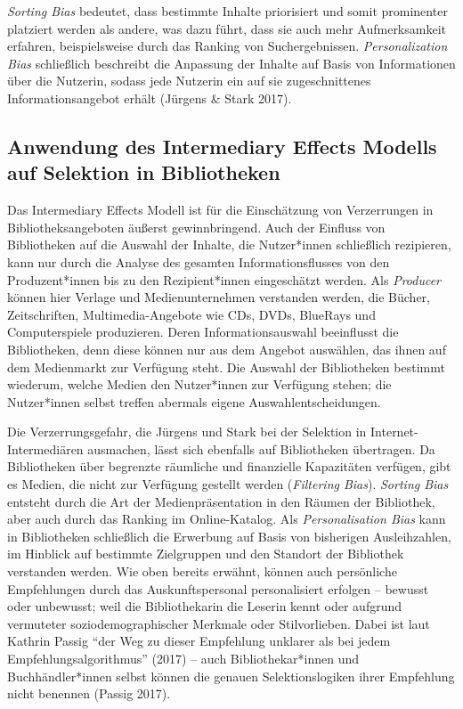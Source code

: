 \documentclass[a4paper,
fontsize=11pt,
oneside,
numbers=noperiodatend,
parskip=half-,
bibliography=totoc,
final
]{scrartcl}
\begin{document}
\emph{Sorting Bias} bedeutet, dass bestimmte Inhalte priorisiert und
somit prominenter platziert werden als andere, was dazu führt, dass sie
auch mehr Aufmerksamkeit erfahren, beispielsweise durch das Ranking von
Suchergebnissen. \emph{Personalization Bias} schließlich beschreibt die
Anpassung der Inhalte auf Basis von Informationen über die Nutzerin,
sodass jede Nutzerin ein auf sie zugeschnittenes Informationsangebot
erhält (Jürgens \& Stark 2017).

\hypertarget{anwendung-des-intermediary-effects-modells-auf-selektion-in-bibliotheken}{%
\subsection{Anwendung des Intermediary Effects Modells auf Selektion in
Bibliotheken}\label{anwendung-des-intermediary-effects-modells-auf-selektion-in-bibliotheken}}

Das Intermediary Effects Modell ist für die Einschätzung von
Verzerrungen in Bibliotheksangeboten äußerst gewinnbringend. Auch der
Einfluss von Bibliotheken auf die Auswahl der Inhalte, die Nutzer*innen
schließlich rezipieren, kann nur durch die Analyse des gesamten
Informationsflusses von den Produzent*innen bis zu den Rezipient*innen
eingeschätzt werden. Als \emph{Producer} können hier Verlage und
Medienunternehmen verstanden werden, die Bücher, Zeitschriften,
Multimedia-Angebote wie CDs, DVDs, BlueRays und Computerspiele
produzieren. Deren Informationsauswahl beeinflusst die Bibliotheken,
denn diese können nur aus dem Angebot auswählen, das ihnen auf dem
Medienmarkt zur Verfügung steht. Die Auswahl der Bibliotheken bestimmt
wiederum, welche Medien den Nutzer*innen zur Verfügung stehen; die
Nutzer*innen selbst treffen abermals eigene Auswahlentscheidungen.

Die Verzerrungsgefahr, die Jürgens und Stark bei der Selektion in
Internet-Intermediären ausmachen, lässt sich ebenfalls auf Bibliotheken
übertragen. Da Bibliotheken über begrenzte räumliche und finanzielle
Kapazitäten verfügen, gibt es Medien, die nicht zur Verfügung gestellt
werden (\emph{Filtering Bias}). \emph{Sorting Bias} entsteht durch die
Art der Medienpräsentation in den Räumen der Bibliothek, aber auch durch
das Ranking im Online-Katalog. Als \emph{Personalisation Bias} kann in
Bibliotheken schließlich die Erwerbung auf Basis von bisherigen
Ausleihzahlen, im Hinblick auf bestimmte Zielgruppen und den Standort
der Bibliothek verstanden werden. Wie oben bereits erwähnt, können auch
persönliche Empfehlungen durch das Auskunftspersonal personalisiert
erfolgen -- bewusst oder unbewusst; weil die Bibliothekarin die Leserin
kennt oder aufgrund vermuteter soziodemographischer Merkmale oder
Stilvorlieben. Dabei ist laut Kathrin Passig \enquote{der Weg zu dieser
Empfehlung unklarer als bei jedem Empfehlungsalgorithmus} (2017) -- auch
Bibliothekar*innen und Buchhändler*innen selbst können die genauen
Selektionslogiken ihrer Empfehlung nicht benennen (Passig 2017).
\end{document}
